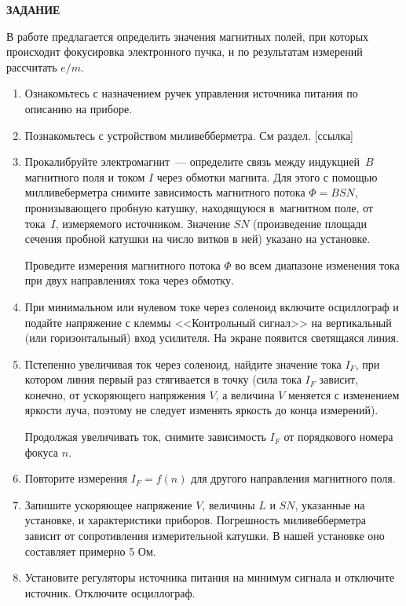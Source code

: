 {\Large \bf ЗАДАНИЕ}

В работе предлагается определить значения магнитных полей, при которых происходит фокусировка электронного пучка, и по результатам измерений рассчитать $e/m$.

\begin{enumerate}
\item{ Ознакомьтесь с назначением ручек управления источника питания по описанию на приборе.}
\item{Познакомьтесь с устройством миливебберметра. См раздел. [ссылка]}
\item{ Прокалибруйте электромагнит~--- определите связь между индукцией~$B$ магнитного поля и током $I$ через обмотки магнита. Для этого с помощью милливеберметра снимите зависимость магнитного потока $\Phi=BSN$, пронизывающего пробную катушку, находящуюся в~магнитном поле, от тока~$I$, измеряемого источником. Значение $SN$ (произведение площади сечения пробной катушки на число витков в ней) указано на установке.

Проведите измерения магнитного потока $\Phi$ во всем диапазоне изменения тока при двух направлениях тока через обмотку.}

\item{ При минимальном или нулевом токе через соленоид включите осциллограф  и подайте напряжение с клеммы <<Контрольный сигнал>> на вертикальный (или горизонтальный) вход усилителя. На экране появится светящаяся линия.}

\item{ Пстепенно увеличивая ток через соленоид, найдите значение тока $I_F$, при котором линия первый раз стягивается в точку (сила тока $I_F$ зависит, конечно, от ускоряющего напряжения $V$, а величина $V$ меняется с изменением яркости луча, поэтому не следует изменять яркость до конца измерений).

     Продолжая увеличивать ток, снимите зависимость $I_F$ от порядкового номера фокуса $n$.}
\item{ Повторите измерения $I_F=f(n)$ для другого направления магнитного поля.}
\item{ Запишите ускоряющее напряжение $V$, величины $L$ и $SN$, указанные на установке, и характеристики приборов. Погрешность миливебберметра зависит от сопротивления измерительной катушки. В нашей установке оно составляет примерно 5 Ом.}
\item{Установите регуляторы источника питания на минимум сигнала и отключите источник. Отключите осциллограф.}
\end{enumerate}

